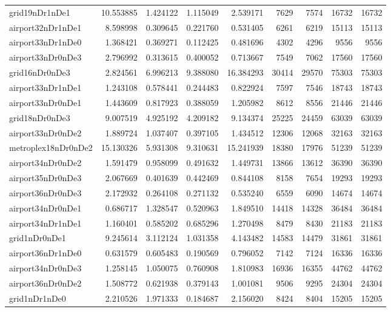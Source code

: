 \begin{longtable}{|l|r|r|r|r|r|r|r|r|}
grid19nDr1nDe1 & 10.553885 & 1.424122 & 1.115049 & 2.539171 & 7629 & 7574 & 16732 & 16732 \\
airport32nDr1nDe1 & 8.598998 & 0.309645 & 0.221760 & 0.531405 & 6261 & 6219 & 15113 & 15113 \\
airport33nDr1nDe0 & 1.368421 & 0.369271 & 0.112425 & 0.481696 & 4302 & 4296 & 9556 & 9556 \\
airport33nDr0nDe3 & 2.796992 & 0.313615 & 0.400052 & 0.713667 & 7549 & 7062 & 17560 & 17560 \\
grid16nDr0nDe3 & 2.824561 & 6.996213 & 9.388080 & 16.384293 & 30414 & 29570 & 75303 & 75303 \\
airport33nDr1nDe1 & 1.243108 & 0.578441 & 0.244483 & 0.822924 & 7597 & 7546 & 18743 & 18743 \\
airport33nDr0nDe1 & 1.443609 & 0.817923 & 0.388059 & 1.205982 & 8612 & 8556 & 21446 & 21446 \\
grid18nDr0nDe3 & 9.007519 & 4.925192 & 4.209182 & 9.134374 & 25225 & 24459 & 63039 & 63039 \\
airport33nDr0nDe2 & 1.889724 & 1.037407 & 0.397105 & 1.434512 & 12306 & 12068 & 32163 & 32163 \\
metroplex18nDr0nDe2 & 15.130326 & 5.931308 & 9.310631 & 15.241939 & 18380 & 17976 & 51239 & 51239 \\
airport34nDr0nDe2 & 1.591479 & 0.958099 & 0.491632 & 1.449731 & 13866 & 13612 & 36390 & 36390 \\
airport35nDr0nDe3 & 2.067669 & 0.401639 & 0.442469 & 0.844108 & 8158 & 7654 & 19293 & 19293 \\
airport36nDr0nDe3 & 2.172932 & 0.264108 & 0.271132 & 0.535240 & 6559 & 6090 & 14674 & 14674 \\
airport34nDr0nDe1 & 0.686717 & 1.328547 & 0.520963 & 1.849510 & 14418 & 14328 & 36484 & 36484 \\
airport34nDr1nDe1 & 1.160401 & 0.585202 & 0.685296 & 1.270498 & 8479 & 8430 & 21183 & 21183 \\
grid1nDr0nDe1 & 9.245614 & 3.112124 & 1.031358 & 4.143482 & 14583 & 14479 & 31861 & 31861 \\
airport36nDr1nDe0 & 0.631579 & 0.605483 & 0.190569 & 0.796052 & 7142 & 7124 & 16336 & 16336 \\
airport34nDr0nDe3 & 1.258145 & 1.050075 & 0.760908 & 1.810983 & 16936 & 16355 & 44762 & 44762 \\
airport36nDr0nDe2 & 1.508772 & 0.621938 & 0.379143 & 1.001081 & 9506 & 9295 & 24304 & 24304 \\
grid1nDr1nDe0 & 2.210526 & 1.971333 & 0.184687 & 2.156020 & 8424 & 8404 & 15205 & 15205 \\

\end{longtable}
